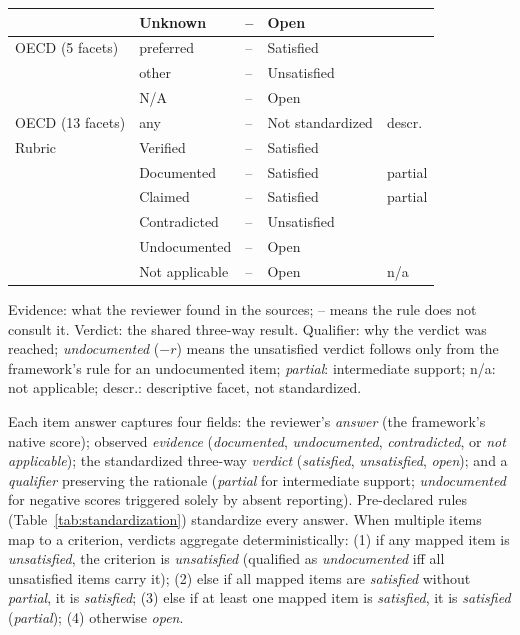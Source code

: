 \documentclass[10pt,conference]{IEEEtran}
\begin{document}
\begin{table}[t]
\begin{tabular}{@{}lllll@{}}
 & Unknown & -- & Open &  \\
\midrule
OECD (5 facets) & preferred & -- & Satisfied &  \\
 & other & -- & Unsatisfied &  \\
 & N/A & -- & Open &  \\
\midrule
OECD (13 facets) & any & -- & Not standardized & descr. \\
\midrule
Rubric & Verified & -- & Satisfied &  \\
 & Documented & -- & Satisfied & partial \\
 & Claimed & -- & Satisfied & partial \\
 & Contradicted & -- & Unsatisfied &  \\
 & Undocumented & -- & Open &  \\
 & Not applicable & -- & Open & n/a \\
\bottomrule
\end{tabular}
\par\vspace{2pt}\raggedright\footnotesize Evidence: what the reviewer found in the sources; -- means the rule does not consult it. Verdict: the shared three-way result. Qualifier: why the verdict was reached; \emph{undocumented} ($-r$) means the unsatisfied verdict follows only from the framework's rule for an undocumented item; \emph{partial}: intermediate support; n/a: not applicable; descr.: descriptive facet, not standardized.
\end{table}

Each item answer captures four fields: the reviewer's \emph{answer} (the framework's native score); observed \emph{evidence} (\emph{documented}, \emph{undocumented}, \emph{contradicted}, or \emph{not applicable}); the standardized three-way \emph{verdict} (\emph{satisfied}, \emph{unsatisfied}, \emph{open}); and a \emph{qualifier} preserving the rationale (\emph{partial} for intermediate support; \emph{undocumented} for negative scores triggered solely by absent reporting). Pre-declared rules (Table~\ref{tab:standardization}) standardize every answer. When multiple items map to a criterion, verdicts aggregate deterministically: (1) if any mapped item is \emph{unsatisfied}, the criterion is \emph{unsatisfied} (qualified as \emph{undocumented} iff all unsatisfied items carry it); (2) else if all mapped items are \emph{satisfied} without \emph{partial}, it is \emph{satisfied}; (3) else if at least one mapped item is \emph{satisfied}, it is \emph{satisfied} (\emph{partial}); (4) otherwise \emph{open}.
\end{document}
